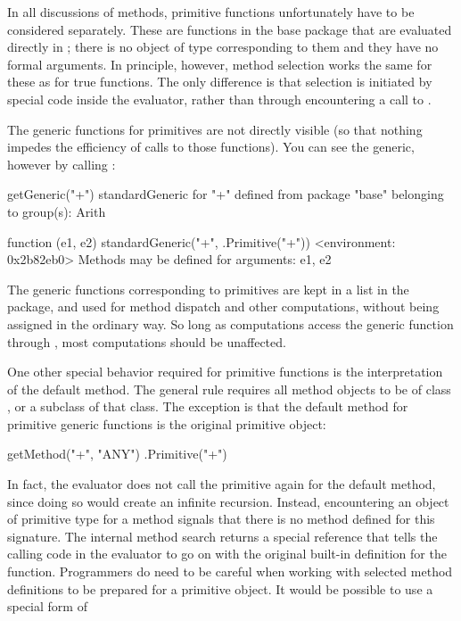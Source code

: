 \documentclass[11pt]{article}
\begin{document}
In all discussions of methods, primitive functions unfortunately have to be considered separately.
These are functions in the base package that are evaluated directly in \C{}; there is no object of type  corresponding to them and they have no formal arguments.
In principle, however, method selection works the same for these as for true functions.
The only difference is that selection is initiated by special code inside the \R{} evaluator, rather than through encountering a call to .

The generic functions for primitives are not directly visible (so that nothing impedes the efficiency of calls to those functions).
You can see the generic, however by calling :
\begin{Example}
\SPrompt{}getGeneric("+")
standardGeneric for "+" defined from package "base"
  belonging to group(s): Arith 

function (e1, e2) 
standardGeneric("+", .Primitive("+"))
<environment: 0x2b82eb0>
Methods may be defined for arguments: e1, e2 
\end{Example}
The generic functions corresponding to primitives are kept in a list in the  package, and used for method dispatch and other computations, without being assigned in the ordinary way.
So long as computations access the generic function through , most computations should be unaffected.

One other special behavior required for primitive functions is the interpretation of the default method.
The general rule requires all method objects to be of class , or a subclass of that class.
The exception is that the default method for primitive generic functions is the original primitive object:
\begin{Example}
\SPrompt{}getMethod("+", "ANY")
.Primitive("+")
\end{Example}
In fact, the evaluator does not call the primitive again for the default method, since doing so would create an infinite recursion.
Instead, encountering an object of primitive type for a method signals that there is no method defined for this signature.
The internal method search returns a special reference that tells the calling code in the evaluator to go on with the original built-in definition for the function.
Programmers do need to be careful when working with selected method definitions to be prepared for a primitive object.
It would be possible to use a special form of 
\end{document}
